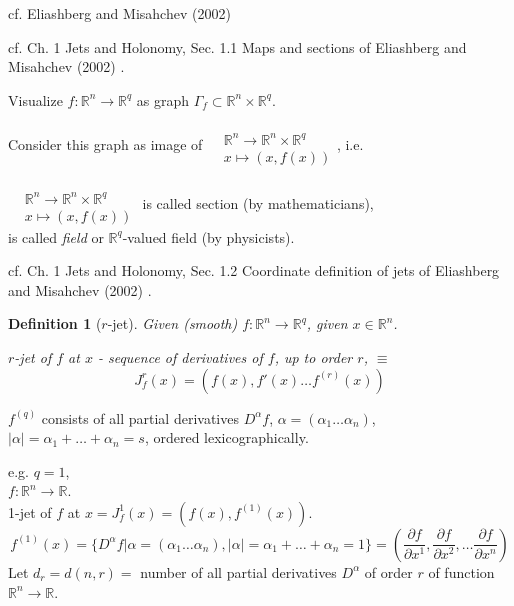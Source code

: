 \documentclass[10pt]{amsart}
\newtheorem{definition}{Definition}
\begin{document}
\begin{multicols*}{2}
cf. Eliashberg and Misahchev (2002) \cite{ElMi2002}

cf. Ch. 1 Jets and Holonomy, Sec. 1.1 Maps and sections of Eliashberg and Misahchev (2002) \cite{ElMi2002}.  

Visualize $f:\mathbb{R}^n \to \mathbb{R}^q$ as graph $\Gamma_f \subset \mathbb{R}^n \times \mathbb{R}^q$.  

Consider this graph as image of $\begin{aligned} & \quad \\ 
	& \mathbb{R}^n \to \mathbb{R}^n \times \mathbb{R}^q \\
	& x \mapsto (x,f(x)) \end{aligned}$, i.e. 

$\begin{aligned} & \quad \\ 
	& \mathbb{R}^n \to \mathbb{R}^n \times \mathbb{R}^q \\
	& x \mapsto (x,f(x)) \end{aligned}$ is called section (by mathematicians), \\
is called \emph{field} or $\mathbb{R}^q$-valued field (by physicists).  

cf. Ch. 1 Jets and Holonomy, Sec. 1.2 Coordinate definition of jets of Eliashberg and Misahchev (2002) \cite{ElMi2002}.  

\begin{definition}[$r$-jet]
Given (smooth) $f: \mathbb{R}^n \to \mathbb{R}^q$, given $x\in \mathbb{R}^n$.  

$r$-jet of $f$ at $x$ - sequence of derivatives of $f$, up to order $r$, $\equiv$ 
\begin{equation}
J^r_f(x) = (f(x),f'(x) \dots f^{(r)}(x) )
\end{equation}
\end{definition}

$f^{(q)}$ consists of all partial derivatives $D^{\alpha}f$, $\alpha= (\alpha_1\dots \alpha_n)$, $|\alpha| = \alpha_1 + \dots + \alpha_n =s$, ordered lexicographically.  

e.g. $q=1$, \\
$f: \mathbb{R}^n \to \mathbb{R}$.   \\
1-jet of $f$ at $x = J_f^1(x) = (f(x), f^{(1)}(x))$.  
\[
f^{(1)}(x) = \lbrace D^{\alpha}f| \alpha = (\alpha_1 \dots \alpha_n), |\alpha| = \alpha_1  + \dots + \alpha_n  =1 \rbrace = \left( \frac{ \partial f}{ \partial x^1 }, \frac{ \partial f}{ \partial x^2 } , \dots \frac{ \partial f}{ \partial x^n } \right)
\]
Let $d_r = d(n,r) = $ number of all partial derivatives $D^{\alpha}$ of order $r$ of function $\mathbb{R}^n \to \mathbb{R}$.  


\end{multicols*}
\end{document}
